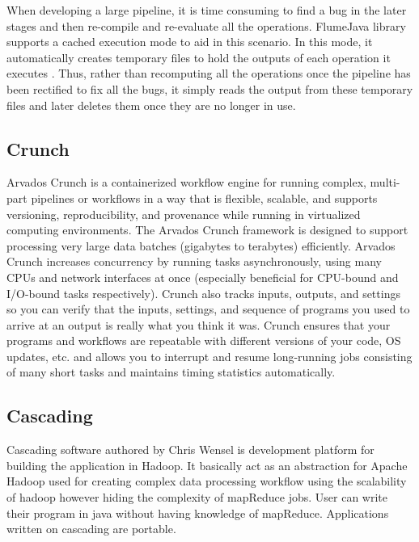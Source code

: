     When developing a large pipeline, it is time consuming to find a
    bug in the later stages and then re-compile and re-evaluate all
    the operations. FlumeJava library supports a cached execution mode
    to aid in this scenario. In this mode, it automatically creates
    temporary files to hold the outputs of each operation it
    executes \cite{flumejava-paper}. Thus, rather than recomputing
    all the operations once the pipeline has been rectified to fix all
    the bugs, it simply reads the output from these temporary files
    and later deletes them once they are no longer in use.    
    
\subsection{Crunch}

    Arvados Crunch \cite{www-arvados} is a containerized workflow
    engine for running complex, multi-part pipelines or workflows in a
    way that is flexible, scalable, and supports versioning,
    reproducibility, and provenance while running in virtualized
    computing environments. The Arvados Crunch \cite{www-crunch}
    framework is designed to support processing very large data
    batches (gigabytes to terabytes) efficiently. Arvados Crunch
    increases concurrency by running tasks asynchronously, using many
    CPUs and network interfaces at once (especially beneficial for
    CPU-bound and I/O-bound tasks respectively). Crunch also tracks
    inputs, outputs, and settings so you can verify that the inputs,
    settings, and sequence of programs you used to arrive at an output
    is really what you think it was. Crunch ensures that your programs
    and workflows are repeatable with different versions of your code,
    OS updates, etc. and allows you to interrupt and resume
    long-running jobs consisting of many short tasks and maintains
    timing statistics automatically.

\subsection{Cascading}

    \cite{www-cascading} Cascading software authored by Chris Wensel
    is development platform for building the application in Hadoop.
    It basically act as an abstraction for Apache Hadoop used for
    creating complex data processing workflow using the scalability of
    hadoop however hiding the complexity of mapReduce jobs.  User can
    write their program in java without having knowledge of
    mapReduce. Applications written on cascading are portable.
 
